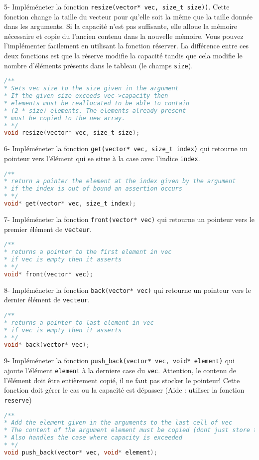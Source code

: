 \documentclass[a4paper]{article}
\begin{document}
	5- Impléméneter la fonction \texttt{resize(vector* vec, size\_t size))}. Cette fonction change la taille du vecteur pour qu'elle soit la même que la taille donnée dans les arguments. Si la capacité n'est pas suffisante, elle alloue la mémoire nécessaire et copie du l'ancien contenu dans la nouvelle mémoire. Vous pouvez l'implémenter facilement en utilisant la fonction réserver. La différence entre ces deux fonctions est que la réserve modifie la capacité tandis que cela modifie le nombre d'éléments présents dans le tableau (le champs \texttt{size}).
\begin{lstlisting}[language=C]
/**
* Sets vec size to the size given in the argument
* If the given size exceeds vec->capacity then
* elements must be reallocated to be able to contain
* (2 * size) elements. The elements already present
* must be copied to the new array.
* */
void resize(vector* vec, size_t size);
\end{lstlisting}

	6- Impléméneter la fonction \texttt{get(vector* vec, size\_t index)} qui retourne un pointeur vers l'élément qui se situe à la case avec l'indice \texttt{index}. 
\begin{lstlisting}[language=C]
/**
* return a pointer the element at the index given by the argument
* if the index is out of bound an assertion occurs
* */
void* get(vector* vec, size_t index);
\end{lstlisting}
	7- Impléméneter la fonction \texttt{front(vector* vec)} qui retourne un pointeur vers le premier élément de \texttt{vecteur}. 
\begin{lstlisting}[language=C]
/**
* returns a pointer to the first element in vec
* if vec is empty then it asserts
* */
void* front(vector* vec);
\end{lstlisting}
	8- Impléméneter la fonction \texttt{back(vector* vec)} qui retourne un pointeur vers le dernier élément de \texttt{vecteur}. 
\begin{lstlisting}[language=C]
/**
* returns a pointer to last element in vec
* if vec is empty then it asserts
* */
void* back(vector* vec);
\end{lstlisting}

	9- Impléméneter la fonction \texttt{push\_back(vector* vec, void* element)} qui ajoute l'élément \texttt{element} à la derniere case du \texttt{vec}. Attention, le contenu de l'élément doit être entièrement copié, il ne faut pas stocker le pointeur! Cette fonction doit gérer le cas ou la capacité est dépasser (Aide : utiliser la fonction \texttt{reserve})
\begin{lstlisting}[language=C]
/**
* Add the element given in the arguments to the last cell of vec
* The content of the argument element must be copied (dont just store the pointer)
* Also handles the case where capacity is exceeded
* */
void push_back(vector* vec, void* element);
\end{lstlisting}
\end{document}
